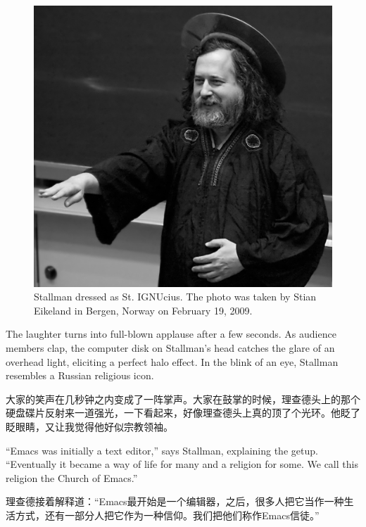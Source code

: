 \ifdefined\eng
\begin{figure}[ht] \centering
  \includegraphics{stignucius}
  \caption{Stallman dressed as St. IGNUcius. The photo was taken by Stian Eikeland in Bergen, Norway on February 19, 2009.}
\end{figure}
\fi

\ifdefined\chs

\fi

\ifdefined\eng
The laughter turns into full-blown applause after a few seconds. As audience members clap, the computer disk on Stallman's head catches the glare of an overhead light, eliciting a perfect halo effect. In the blink of an eye, Stallman resembles a Russian religious icon.
\fi

\ifdefined\chs
大家的笑声在几秒钟之内变成了一阵掌声。大家在鼓掌的时候，理查德头上的那个硬盘碟片反射来一道强光，一下看起来，好像理查德头上真的顶了个光环。他眨了眨眼睛，又让我觉得他好似宗教领袖。
\fi

\ifdefined\eng
``Emacs was initially a text editor,'' says Stallman, explaining the getup. ``Eventually it became a way of life for many and a religion for some. We call this religion the Church of Emacs.''
\fi

\ifdefined\chs
理查德接着解释道：``Emacs最开始是一个编辑器，之后，很多人把它当作一种生活方式，还有一部分人把它作为一种信仰。我们把他们称作Emacs信徒。''
\fi

